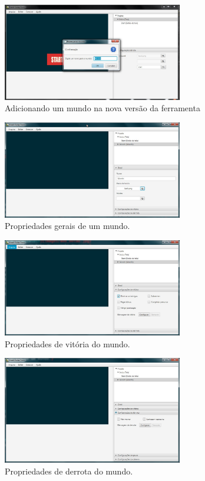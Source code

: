 \documentclass[12pt,oneside,openright,a4paper,english,brazil,sumario=tradicional]{abntex2}
\begin{document}
\begin{anexosenv}
   \begin{figure}[H]
   \centering
   \includegraphics[width=0.7\textwidth]{images/add_mundo.jpg}
   \caption{Adicionando um mundo na nova versão da ferramenta}
   \label{fig:add_mundo}
   \end{figure}

   \begin{figure}[H]
   \centering
   \includegraphics[width=0.7\textwidth]{images/add_mundo_2.jpg}
   \caption{Propriedades gerais de um mundo.}
   \label{fig:add_mundo_2}
   \end{figure}

   \begin{figure}[H]
   \centering
   \includegraphics[width=0.7\textwidth]{images/add_mundo_3.jpg}
   \caption{Propriedades de vitória do mundo.}
   \label{fig:add_mundo_3}
   \end{figure}

   \begin{figure}[H]
   \centering
   \includegraphics[width=0.7\textwidth]{images/add_mundo_4.jpg}
   \caption{Propriedades de derrota do mundo.}
   \label{fig:add_mundo_4}
   \end{figure}


\end{anexosenv}
\end{document}
